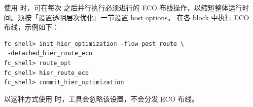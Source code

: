 使用  时，可在每次  之后并行执行必须进行的 ECO 布线操作，以缩短整体运行时间。须按「设置透明层次优化」一节设置 host options。 在各 block 中执行 ECO 布线，示例如下：
\begin{lstlisting}
fc_shell> init_hier_optimization -flow post_route \
 -detached_hier_route_eco
fc_shell> route_opt
fc_shell> hier_route_eco
fc_shell> commit_hier_optimization
\end{lstlisting}

\begin{noteBox}
以这种方式使用  时，工具会忽略该设置，不会分发 ECO 布线。
\end{noteBox}
